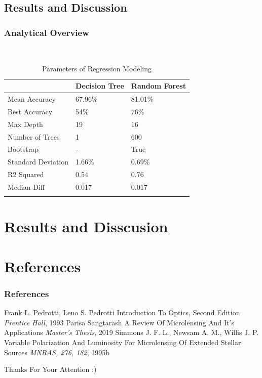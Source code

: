 \documentclass{beamer}
\begin{document}
\subsection{Results and Discussion}

\begin{frame}
	\frametitle{Analytical Overview}
    \begin{table}[ht]\
        \caption*{Parameters of Regression Modeling} %
        \centering %
        \begin{tabular}{l l l} %
        \hline\hline %
         &Decision Tree & Random Forest\\ [0.5ex] %
        \hline %
        Mean Accuracy& 67.96\%  & 81.01\%  \\ %
        Best Accuracy & 54\% & 76\%  \\
        Max Depth & 19 & 16  \\
        Number of Trees &  1 & 600  \\
        Bootstrap &  - & True  \\
        Standard Deviation &   1.66\% & 0.69\%  \\
        R2 Squared &  0.54 & 0.76  \\
        Median Diff &  0.017 & 0.017  \\ [1ex] %
        \hline %
        \\
        \end{tabular}
        \end{table}
        \end{frame}
\section{Results and Disscusion}
\section{References}
\begin{frame}
\frametitle{References}
\footnotesize{
\begin{thebibliography}{99} %
\bibitem[Pedrotti, 1993]{p1} Frank L. Pedrotti, Leno S. Pedrotti
\newblock Introduction To Optics, Second Edition
\newblock \emph{Prentice Hall}, 1993
 Parisa Sangtarash
\newblock A Review Of Microlensing And It's Applications
\newblock \emph{Master's Thesis}, 2019
 Simmons J. F. L., Newsam A. M., Willis J. P.
\newblock Variable Polarization And Luminosity For Microlensing Of Extended Stellar Sources
\newblock \emph{MNRAS, 276, 182}, 1995b
\end{thebibliography}
}
\end{frame}


\begin{frame}
\Huge{\centerline{Thanks For Your Attention :)}}
\end{frame}

\end{document}
